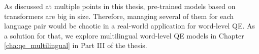 As discussed at multiple points in this thesis, pre-trained models based on transformers are big in size. Therefore, managing several of them for each language pair would be chaotic in a real-world application for word-level QE. As a solution for that, we explore multilingual word-level QE models in Chapter \ref{cha:qe_multilingual} in Part III of the thesis.



